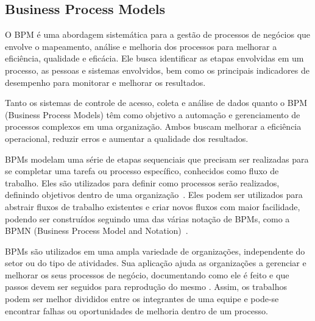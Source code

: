 \subsection{Business Process Models}


O BPM é uma abordagem sistemática para a gestão de processos de negócios que envolve o mapeamento, análise e melhoria dos processos para melhorar a eficiência, qualidade e eficácia. Ele busca identificar as etapas envolvidas em um processo, as pessoas e sistemas envolvidos, bem como os principais indicadores de desempenho para monitorar e melhorar os resultados.


Tanto os sistemas de controle de acesso, coleta e análise de dados quanto o BPM (Business Process Models) têm como objetivo a automação e gerenciamento de processos complexos em uma organização. Ambos buscam melhorar a eficiência operacional, reduzir erros e aumentar a qualidade dos resultados.


BPMs modelam uma série de etapas sequenciais que precisam ser realizadas para se completar uma tarefa ou processo específico, conhecidos como fluxo de trabalho. Eles são utilizados para definir como processos serão realizados, definindo objetivos dentro de uma organização~\cite{Alves2014UnderstandingOrganizations}. Eles podem ser utilizados para abstrair fluxos de trabalho existentes e criar novos fluxos com maior facilidade, podendo ser construídos seguindo uma das várias notação de BPMs, como a BPMN (Business Process Model and Notation)~\cite{Dijkman2008SemanticsBPMN}.



BPMs são utilizados em uma ampla variedade de organizações, independente do setor ou do tipo de atividades. Sua aplicação ajuda as organizações a gerenciar e melhorar os seus processos de negócio, documentando como ele é feito e que passos devem ser seguidos para reprodução do mesmo \R. Assim, os trabalhos podem ser melhor divididos entre os integrantes de uma equipe e pode-se encontrar falhas ou oportunidades de melhoria dentro de um processo.

